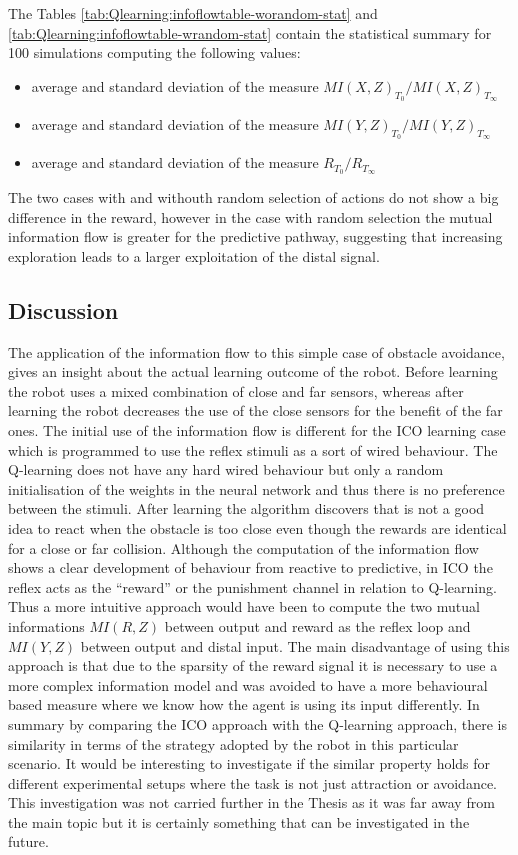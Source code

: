 The Tables \ref{tab:Qlearning:infoflowtable-worandom-stat} and \ref{tab:Qlearning:infoflowtable-wrandom-stat}
 contain the statistical summary for 100 simulations computing the following values:
\begin{itemize}
 \item average and standard deviation of the measure $MI(X,Z)_{T_0}/ MI(X,Z)_{T_\infty}$
 \item average and standard deviation of the measure $MI(Y,Z)_{T_0}/ MI(Y,Z)_{T_\infty}$
 \item average and standard deviation of the measure $R_{T_0} / R_{T_\infty}$
\end{itemize}
The two cases with and withouth random selection of actions do not show a big
difference in the reward, however in the case with random selection the mutual
information flow is greater for the predictive pathway, suggesting that
increasing exploration leads to a larger exploitation of the distal signal.

\subsection{Discussion}
The application of the information flow to this simple case of obstacle avoidance,
gives an insight about the actual learning outcome of the robot.
Before learning the robot uses a mixed combination of close and far sensors,
whereas after learning the robot decreases the use of the close sensors
for the benefit of the far ones.
The initial use of the information flow is different for the ICO learning case
which is programmed to use the reflex stimuli as a sort of wired behaviour.
The Q-learning does not have any hard wired behaviour but only a random
initialisation of the weights in the neural network and thus there is no preference
between the stimuli.
After learning the algorithm discovers that is not a good idea to react
when the obstacle is too close even though the rewards are identical for
a close or far collision.
Although the computation of the information flow shows a clear development of 
behaviour from reactive to predictive, in ICO the reflex acts as the ``reward'' or 
the punishment channel in relation to Q-learning.
Thus a more intuitive approach would have been to compute the two mutual 
informations $MI(R,Z)$ between output and reward as the reflex loop and $MI(Y,Z)$
between output and distal input.
The main disadvantage of using this approach is that due to the sparsity of the 
reward signal it is necessary to use a more complex information model and was avoided
to have a more behavioural based measure where we know how the agent is using
its input differently.
In summary by comparing the ICO approach with the Q-learning approach,
there is similarity in terms of the strategy adopted by the robot in this particular
scenario.
It would be interesting to investigate if the similar property holds for
different experimental setups where the task is not just attraction or avoidance.
This investigation was not carried further in the Thesis as it was far away from the
main topic but it is certainly something that can be investigated in the future.

